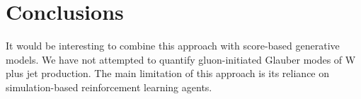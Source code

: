 \section{Conclusions}\label{sec:conclusions}

It would be interesting to combine this approach with score-based
generative models. We have not attempted to quantify gluon-initiated
Glauber modes of W plus jet production. The main limitation of this
approach is its reliance on simulation-based reinforcement learning
agents.

